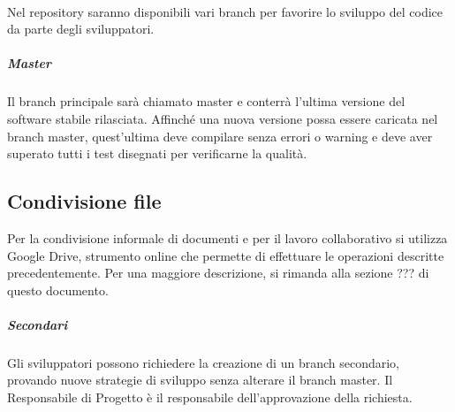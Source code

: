 \paragraph{}
\label{4.4}
Nel repository saranno disponibili vari branch per favorire lo sviluppo del codice da parte degli sviluppatori.

\subparagraph{Master}
\label{4.4.1}
Il branch principale sarà chiamato master e conterrà l'ultima versione del software stabile rilasciata. Affinché una nuova versione possa essere caricata nel branch master, quest'ultima deve compilare senza errori o warning e deve aver superato tutti i test disegnati per verificarne la qualità.

\subsection{Condivisione file}
Per la condivisione informale di documenti e per il lavoro collaborativo si utilizza Google Drive, strumento online che permette di effettuare le operazioni descritte precedentemente. Per una maggiore descrizione, si rimanda alla sezione ??? di questo documento.

\subparagraph{Secondari}
\label{4.4.2}
Gli sviluppatori possono richiedere la creazione di un branch secondario, provando nuove strategie di sviluppo senza alterare il branch master. Il Responsabile di Progetto è il responsabile dell'approvazione della richiesta.

\newpage




\newpage
